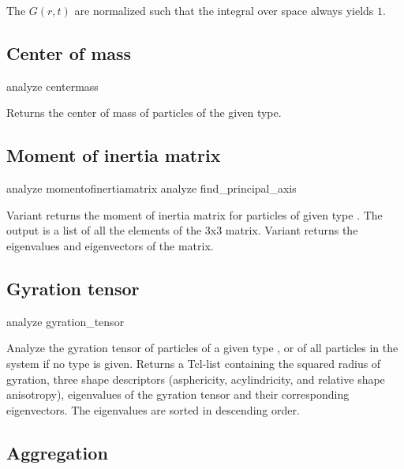 The $G(r,t)$ are normalized such that the integral over space always
yields $1$.

\subsection{Center of mass}
\label{analyze:centermass}
\begin{essyntax}
  analyze centermass 
\end{essyntax}
Returns the center of mass of particles of the given type.

\subsection{Moment of inertia matrix}
\label{analyze:momentofinteratiamatrix}
\label{analyze:find-principal-axis}

\begin{essyntax}
   analyze momentofinertiamatrix {  } 
   analyze find_principal_axis 
\end{essyntax}
Variant  returns the moment of inertia matrix for particles
of given type . The output is a list of all the elements
of the 3x3 matrix. Variant  returns the eigenvalues and
eigenvectors of the matrix.

\subsection{Gyration tensor}
\label{analyze:gyration-tensor}

\begin{essyntax}
  analyze gyration\_tensor  
\end{essyntax}
Analyze the gyration tensor of particles of a given type ,
or of all particles in the system if no type is given.
Returns a Tcl-list containing the squared radius of gyration,
 three shape descriptors (asphericity, acylindricity,
 and relative shape anisotropy), eigenvalues of the gyration tensor and their
corresponding eigenvectors. The eigenvalues are sorted in descending order.

\subsection{Aggregation}
\label{analyze:aggregation}


